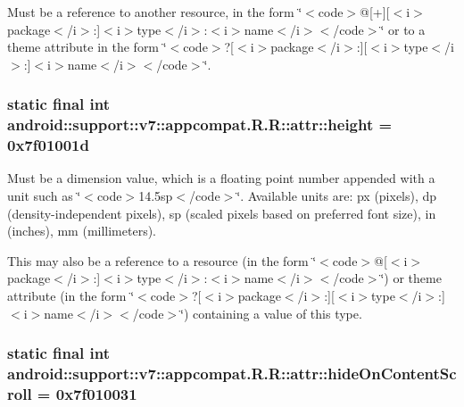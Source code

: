 Must be a reference to another resource, in the form \char`\"{}$<$code$>$@\mbox{[}+\mbox{]}\mbox{[}$<$i$>$package$<$/i$>$:\mbox{]}$<$i$>$type$<$/i$>$:$<$i$>$name$<$/i$>$$<$/code$>$\char`\"{} or to a theme attribute in the form \char`\"{}$<$code$>$?\mbox{[}$<$i$>$package$<$/i$>$:\mbox{]}\mbox{[}$<$i$>$type$<$/i$>$:\mbox{]}$<$i$>$name$<$/i$>$$<$/code$>$\char`\"{}. \hypertarget{classandroid_1_1support_1_1v7_1_1appcompat_1_1_r_1_1attr_5a1e6899761c89ca4f5bc1f40241433c}{
\subsubsection[{height}]{\setlength{\rightskip}{0pt plus 5cm}static final int android::support::v7::appcompat.R.R::attr::height = 0x7f01001d}}
\label{classandroid_1_1support_1_1v7_1_1appcompat_1_1_r_1_1attr_5a1e6899761c89ca4f5bc1f40241433c}


Must be a dimension value, which is a floating point number appended with a unit such as \char`\"{}$<$code$>$14.5sp$<$/code$>$\char`\"{}. Available units are: px (pixels), dp (density-independent pixels), sp (scaled pixels based on preferred font size), in (inches), mm (millimeters). 

This may also be a reference to a resource (in the form \char`\"{}$<$code$>$@\mbox{[}$<$i$>$package$<$/i$>$:\mbox{]}$<$i$>$type$<$/i$>$:$<$i$>$name$<$/i$>$$<$/code$>$\char`\"{}) or theme attribute (in the form \char`\"{}$<$code$>$?\mbox{[}$<$i$>$package$<$/i$>$:\mbox{]}\mbox{[}$<$i$>$type$<$/i$>$:\mbox{]}$<$i$>$name$<$/i$>$$<$/code$>$\char`\"{}) containing a value of this type. \hypertarget{classandroid_1_1support_1_1v7_1_1appcompat_1_1_r_1_1attr_e7faeab462f1799f00c5b31b4eae42da}{
\subsubsection[{hideOnContentScroll}]{\setlength{\rightskip}{0pt plus 5cm}static final int android::support::v7::appcompat.R.R::attr::hideOnContentScroll = 0x7f010031}}
\label{classandroid_1_1support_1_1v7_1_1appcompat_1_1_r_1_1attr_e7faeab462f1799f00c5b31b4eae42da}


